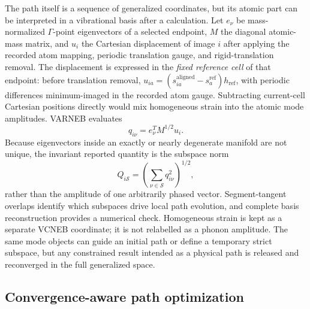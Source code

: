 \documentclass[final,5p,times,twocolumn]{elsarticle}
\begin{document}
The path itself is a sequence of generalized coordinates, but its atomic part
can be interpreted in a vibrational basis after a calculation. Let
$e_\nu$ be mass-normalized $\Gamma$-point eigenvectors of a selected endpoint,
$M$ the diagonal atomic-mass matrix, and $u_i$ the Cartesian displacement of
image $i$ after applying the recorded atom mapping, periodic translation
gauge, and rigid-translation removal.
The displacement is expressed in the \emph{fixed reference cell} of that
endpoint: before translation removal,
$u_{ia}=(s_{ia}^{\mathrm{aligned}}-s_a^{\mathrm{ref}})h_{\mathrm{ref}}$,
with periodic differences minimum-imaged in the recorded atom gauge.
Subtracting current-cell Cartesian positions directly would mix homogeneous
strain into the atomic mode amplitudes. VARNEB evaluates
\begin{equation}
 q_{i\nu}=e_\nu^{T}M^{1/2}u_i .
 \label{eq:mode-coordinate}
\end{equation}
Because eigenvectors inside an exactly or nearly degenerate manifold are not
unique, the invariant reported quantity is the subspace norm
\begin{equation}
 Q_{i\mathcal{S}}=\left(\sum_{\nu\in\mathcal{S}}q_{i\nu}^{2}\right)^{1/2},
 \label{eq:subspace-coordinate}
\end{equation}
rather than the amplitude of one arbitrarily phased vector. Segment-tangent
overlaps identify which subspaces drive local path evolution, and complete
basis reconstruction provides a numerical check. Homogeneous strain is kept
as a separate VCNEB coordinate; it is not relabelled as a phonon amplitude.
The same mode objects can guide an initial path or define a temporary strict
subspace, but any constrained result intended as a physical path is released
and reconverged in the full generalized space.

\subsection{Convergence-aware path optimization}
\label{sec:acceleration}
\end{document}
